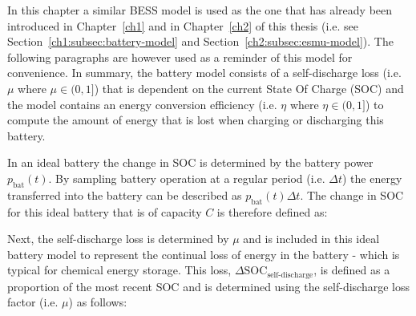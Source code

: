 In this chapter a similar BESS model is used as the one that has already been introduced in Chapter~\ref{ch1} and in Chapter~\ref{ch2} of this thesis (i.e. see Section~\ref{ch1:subsec:battery-model} and Section~\ref{ch2:subsec:esmu-model}).
The following paragraphs are however used as a reminder of this model for convenience.
In summary, the battery model consists of a self-discharge loss (i.e. $\mu$ where $\mu \in (0, 1]$) that is dependent on the current State Of Charge (SOC) and the model contains an energy conversion efficiency (i.e. $\eta$ where $\eta \in (0, 1]$) to compute the amount of energy that is lost when charging or discharging this battery.

\nomenclature[L]{$\mu$}{Self-discharge loss factor, where $\mu \in (0, 1]$}
\nomenclature[L]{$\eta$}{Energy conversion efficiency, where $\eta \in (0, 1]$}
\nomenclature[L]{$\hat{\eta}$}{Direction dependent energy conversion efficiency, where $\hat{\eta} \in (0, 1]$}

In an ideal battery the change in SOC is determined by the battery power $p_\text{bat}(t)$.
By sampling battery operation at a regular period (i.e. $\Delta t$) the energy transferred into the battery can be described as $p_\text{bat}(t)\Delta t$.
The change in SOC for this ideal battery that is of capacity $C$ is therefore defined as:



Next, the self-discharge loss is determined by $\mu$ and is included in this ideal battery model to represent the continual loss of energy in the battery - which is typical for chemical energy storage.
This loss, $\Delta\text{SOC}_\text{self-discharge}$, is defined as a proportion of the most recent SOC and is determined using the self-discharge loss factor (i.e. $\mu$) as follows:

